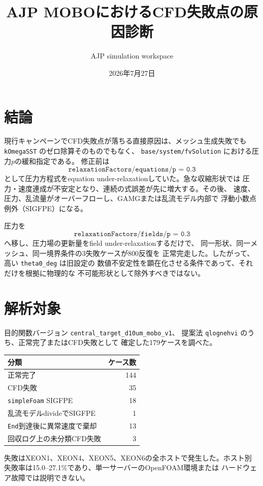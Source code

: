 \documentclass[a4paper,11pt]{article}
\title{AJP MOBOにおけるCFD失敗点の原因診断}
\author{AJP simulation workspace}
\date{2026年7月27日}
\begin{document}
\maketitle

\section{結論}

現行キャンペーンでCFD失敗点が落ちる直接原因は、メッシュ生成失敗でも
\texttt{kOmegaSST} のゼロ除算そのものでもなく、
\texttt{base/system/fvSolution} における圧力$p$の緩和指定である。
修正前は
\[
  \texttt{relaxationFactors/equations/p = 0.3}
\]
として圧力方程式をequation under-relaxationしていた。急な収縮形状では
圧力・速度連成が不安定となり、連続の式誤差が先に増大する。その後、
速度、圧力、乱流量がオーバーフローし、GAMGまたは乱流モデル内部で
浮動小数点例外（SIGFPE）になる。

圧力を
\[
  \boxed{\texttt{relaxationFactors/fields/p = 0.3}}
\]
へ移し、圧力場の更新量をfield under-relaxationするだけで、
同一形状、同一メッシュ、同一境界条件の3失敗ケースが800反復を
正常完走した。したがって、高い \texttt{theta0\_deg} は旧設定の
数値不安定性を顕在化させる条件であって、それだけを根拠に物理的な
不可能形状として除外すべきではない。

\section{解析対象}

目的関数バージョン
\texttt{central\_target\_d10um\_mobo\_v1}、
提案法 \texttt{qlognehvi} のうち、正常完了またはCFD失敗として
確定した179ケースを調べた。

\begin{center}
\begin{tabular}{lr}
\toprule
分類 & ケース数 \\
\midrule
正常完了 & 144 \\
CFD失敗 & 35 \\
\quad \texttt{simpleFoam} SIGFPE & 18 \\
\quad 乱流モデルdivideでSIGFPE & 1 \\
\quad \texttt{End}到達後に異常速度で棄却 & 13 \\
\quad 回収ログ上の未分類CFD失敗 & 3 \\
\bottomrule
\end{tabular}
\end{center}

失敗はXEON1、XEON4、XEON5、XEON6の全ホストで発生した。ホスト別
失敗率は15.0--27.1\%であり、単一サーバーのOpenFOAM環境または
ハードウェア故障では説明できない。
\end{document}
